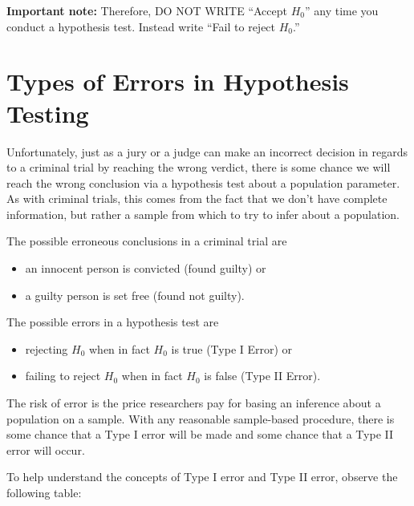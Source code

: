 \documentclass[]{tufte-book}
\providecommand{\tightlist}{%
  \setlength{\itemsep}{0pt}\setlength{\parskip}{0pt}}
\theoremstyle{definition}
\theoremstyle{definition}
\theoremstyle{remark}
\begin{document}
\textbf{Important note:} Therefore, DO NOT WRITE ``Accept \(H_0\)'' any
time you conduct a hypothesis test. Instead write ``Fail to reject
\(H_0\).''

\section{Types of Errors in Hypothesis
Testing}\label{types-of-errors-in-hypothesis-testing}

Unfortunately, just as a jury or a judge can make an incorrect decision
in regards to a criminal trial by reaching the wrong verdict, there is
some chance we will reach the wrong conclusion via a hypothesis test
about a population parameter. As with criminal trials, this comes from
the fact that we don't have complete information, but rather a sample
from which to try to infer about a population.

The possible erroneous conclusions in a criminal trial are

\begin{itemize}
\tightlist
\item
  an innocent person is convicted (found guilty) or
\item
  a guilty person is set free (found not guilty).
\end{itemize}

The possible errors in a hypothesis test are

\begin{itemize}
\tightlist
\item
  rejecting \(H_0\) when in fact \(H_0\) is true (Type I Error) or
\item
  failing to reject \(H_0\) when in fact \(H_0\) is false (Type II
  Error).
\end{itemize}

The risk of error is the price researchers pay for basing an inference
about a population on a sample. With any reasonable sample-based
procedure, there is some chance that a Type I error will be made and
some chance that a Type II error will occur.

To help understand the concepts of Type I error and Type II error,
observe the following table:
\end{document}
